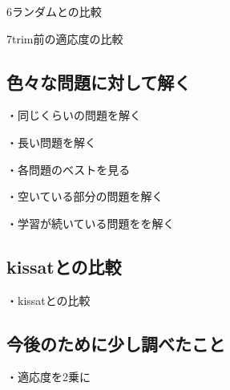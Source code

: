 6ランダムとの比較

7trim前の適応度の比較

\subsection{色々な問題に対して解く}%

・同じくらいの問題を解く

・長い問題を解く

・各問題のベストを見る

・空いている部分の問題を解く

・学習が続いている問題をを解く

\subsection{kissatとの比較}%

・kissatとの比較

\subsection{今後のために少し調べたこと}

・適応度を2乗に